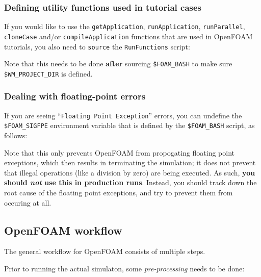 \subsubsection{Defining utility functions used in tutorial cases}

If you would like to use the \texttt{\small{getApplication}}, \texttt{\small{runApplication}},
\texttt{\small{runParallel}}, \texttt{\small{cloneCase}} and/or \texttt{\small{compileApplication}} functions that are
used in OpenFOAM tutorials, you also need to \texttt{\small{source}} the \texttt{\small{RunFunctions}} script:

\begin{prompt}
\end{prompt}

Note that this needs to be done \textbf{after} sourcing \texttt{\small{\$FOAM\_BASH}} to make sure
\texttt{\small{\$WM\_PROJECT\_DIR}} is defined.


\subsubsection{Dealing with floating-point errors}

If you are seeing ``\texttt{\small{Floating Point Exception}}'' errors, you can undefine the
\texttt{\small{\$FOAM\_SIGFPE}} environment variable that is defined by the \texttt{\small{\$FOAM\_BASH}} script,
as follows:

\begin{prompt}
\end{prompt}

Note that this only prevents OpenFOAM from propogating floating point exceptions, which then results in
terminating the simulation; it does not prevent that illegal operations (like a division by zero) are being executed.
As such, \textbf{you should \textit{not} use this in production runs}. Instead, you should track down the root cause
of the floating point exceptions, and try to prevent them from occuring at all.


\subsection{OpenFOAM workflow}

The general workflow for OpenFOAM consists of multiple steps.

Prior to running the actual simulaton, some \textit{pre-processing} needs to be done:

